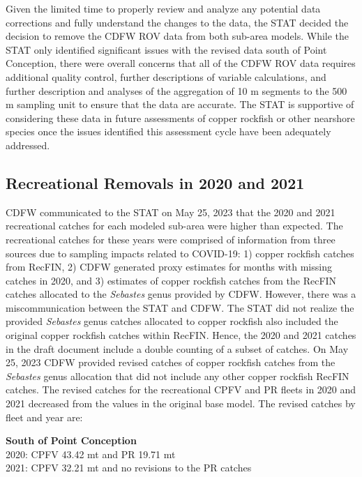 \documentclass[
  letterpaper,
]{article}
\begin{document}
Given the limited time to properly review and analyze any potential data corrections and fully understand the changes to the data, the STAT decided the decision to remove the CDFW ROV data from both sub-area models. While the STAT only identified significant issues with the revised data south of Point Conception, there were overall concerns that all of the CDFW ROV data requires additional quality control, further descriptions of variable calculations, and further description and analyses of the aggregation of 10 m segments to the 500 m sampling unit to ensure that the data are accurate. The STAT is supportive of considering these data in future assessments of copper rockfish or other nearshore species once the issues identified this assessment cycle have been adequately addressed.

\hypertarget{recreational-removals-in-2020-and-2021}{%
\subsection{Recreational Removals in 2020 and 2021}\label{recreational-removals-in-2020-and-2021}}

CDFW communicated to the STAT on May 25, 2023 that the 2020 and 2021 recreational catches for each modeled sub-area were higher than expected. The recreational catches for these years were comprised of information from three sources due to sampling impacts related to COVID-19: 1) copper rockfish catches from RecFIN, 2) CDFW generated proxy estimates for months with missing catches in 2020, and 3) estimates of copper rockfish catches from the RecFIN catches allocated to the \emph{Sebastes} genus provided by CDFW. However, there was a miscommunication between the STAT and CDFW. The STAT did not realize the provided \emph{Sebastes} genus catches allocated to copper rockfish also included the original copper rockfish catches within RecFIN. Hence, the 2020 and 2021 catches in the draft document include a double counting of a subset of catches. On May 25, 2023 CDFW provided revised catches of copper rockfish catches from the \emph{Sebastes} genus allocation that did not include any other copper rockfish RecFIN catches. The revised catches for the recreational CPFV and PR fleets in 2020 and 2021 decreased from the values in the original base model. The revised catches by fleet and year are:

\textbf{South of Point Conception}\\
2020: CPFV 43.42 mt and PR 19.71 mt\\
2021: CPFV 32.21 mt and no revisions to the PR catches
\end{document}
